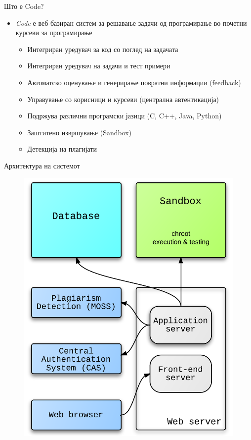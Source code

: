 \begin{frame}{Што е Code?}
    \begin{itemize}
      \item \emph{Code} е веб-базиран систем за решавање задачи од
      програмирање во почетни курсеви за програмирање
      \begin{itemize}
        \item Интегриран уредувач за код со поглед на задачата
        \item Интегриран уредувач на задачи и тест примери
        \item Автоматско оценување и генерирање повратни информации (feedback)
        \item Управување со корисници и курсеви (централна автентикација)
        \item Подржува различни програмски јазици (C, C++, Java, Python)
        \item Заштитено извршување (Sandbox)
        \item Детекција на плагијати
      \end{itemize}
    \end{itemize}
\end{frame}

\begin{frame}{Архитектура на системот}
    \begin{figure}
    \centering
      \includegraphics[width=.45\textwidth]{images/architecture-new}        
    \end{figure}
\end{frame}

